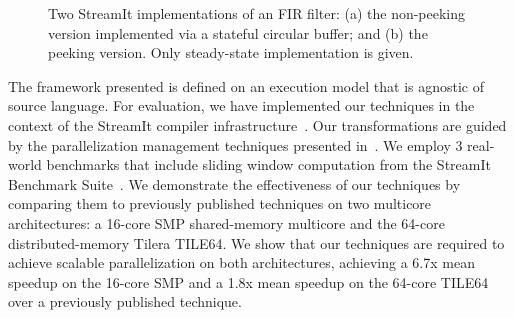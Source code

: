 \begin{figure}[t]
\caption[Two implementations of an FIR filter.]{\label{fig:fir-code}
  Two StreamIt implementations of an FIR filter:
   (a) the non-peeking version implemented via a
  stateful circular buffer; and (b) the peeking version. Only steady-state implementation is
  given.}
\vspace{-10pt}
\end{figure}

The framework presented is defined on an execution model that is
agnostic of source language.  For evaluation, we have implemented our
techniques in the context of the StreamIt compiler
infrastructure~\cite{gordon-asplos06}.  Our transformations are guided
by the parallelization management techniques presented
in~\cite{gordon-asplos06}.  We employ 3 real-world benchmarks that
include sliding window computation from the StreamIt Benchmark
Suite~\cite{streamit-suite}.  We demonstrate the effectiveness of our
techniques by comparing them to previously published techniques on two
multicore architectures: a 16-core SMP shared-memory multicore and the
64-core distributed-memory Tilera TILE64.  We show that our techniques
are required to achieve scalable parallelization on both
architectures, achieving a 6.7x mean speedup on the 16-core SMP and a
1.8x mean speedup on the 64-core TILE64 over a
previously published technique.




